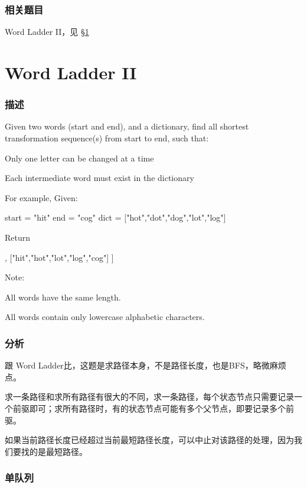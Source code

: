 \subsubsection{相关题目}

\begindot
\item Word Ladder II，见 \S \ref{sec:word-ladder-ii}
\myenddot


\section{Word Ladder II} %
\label{sec:word-ladder-ii}


\subsubsection{描述}
Given two words (start and end), and a dictionary, find all shortest transformation sequence(s) from start to end, such that:
\begindot
\item Only one letter can be changed at a time
\item Each intermediate word must exist in the dictionary
\myenddot

For example, Given:
\begin{Code}
start = "hit"
end = "cog"
dict = ["hot","dot","dog","lot","log"]
\end{Code}
Return
\begin{Code}
[
    ["hit","hot","dot","dog","cog"],
    ["hit","hot","lot","log","cog"]
]
\end{Code}

Note:
\begindot
\item All words have the same length.
\item All words contain only lowercase alphabetic characters.
\myenddot


\subsubsection{分析}
跟 Word Ladder比，这题是求路径本身，不是路径长度，也是BFS，略微麻烦点。

求一条路径和求所有路径有很大的不同，求一条路径，每个状态节点只需要记录一个前驱即可；求所有路径时，有的状态节点可能有多个父节点，即要记录多个前驱。

如果当前路径长度已经超过当前最短路径长度，可以中止对该路径的处理，因为我们要找的是最短路径。


\subsubsection{单队列}

